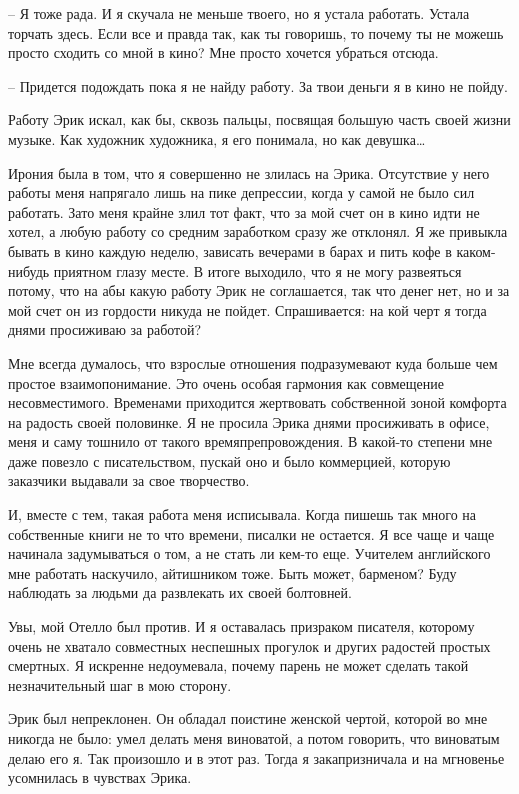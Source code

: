 \documentclass[
]{book}
\begin{document}
-- Я тоже рада. И я скучала не меньше твоего, но я устала работать. Устала торчать здесь. Если все и правда так, как ты говоришь, то почему ты не можешь просто сходить со мной в кино? Мне просто хочется убраться отсюда.

-- Придется подождать пока я не найду работу. За твои деньги я в кино не пойду.

Работу Эрик искал, как бы, сквозь пальцы, посвящая большую часть своей жизни музыке. Как художник художника, я его понимала, но как девушка\ldots{}

Ирония была в том, что я совершенно не злилась на Эрика. Отсутствие у него работы меня напрягало лишь на пике депрессии, когда у самой не было сил работать. Зато меня крайне злил тот факт, что за мой счет он в кино идти не хотел, а любую работу со средним заработком сразу же отклонял. Я же привыкла бывать в кино каждую неделю, зависать вечерами в барах и пить кофе в каком-нибудь приятном глазу месте. В итоге выходило, что я не могу развеяться потому, что на абы какую работу Эрик не соглашается, так что денег нет, но и за мой счет он из гордости никуда не пойдет. Спрашивается: на кой черт я тогда днями просиживаю за работой?

Мне всегда думалось, что взрослые отношения подразумевают куда больше чем простое взаимопонимание. Это очень особая гармония как совмещение несовместимого. Временами приходится жертвовать собственной зоной комфорта на радость своей половинке. Я не просила Эрика днями просиживать в офисе, меня и саму тошнило от такого времяпрепровождения. В какой-то степени мне даже повезло с писательством, пускай оно и было коммерцией, которую заказчики выдавали за свое творчество.

И, вместе с тем, такая работа меня исписывала. Когда пишешь так много на собственные книги не то что времени, писалки не остается. Я все чаще и чаще начинала задумываться о том, а не стать ли кем-то еще. Учителем английского мне работать наскучило, айтишником тоже. Быть может, барменом? Буду наблюдать за людьми да развлекать их своей болтовней.

Увы, мой Отелло был против. И я оставалась призраком писателя, которому очень не хватало совместных неспешных прогулок и других радостей простых смертных. Я искренне недоумевала, почему парень не может сделать такой незначительный шаг в мою сторону.

Эрик был непреклонен. Он обладал поистине женской чертой, которой во мне никогда не было: умел делать меня виноватой, а потом говорить, что виноватым делаю его я. Так произошло и в этот раз. Тогда я закапризничала и на мгновенье усомнилась в чувствах Эрика.
\end{document}

